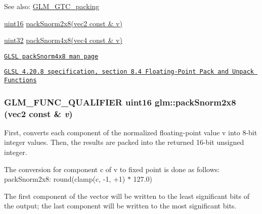 \begin{Desc}
\item[See also:]\hyperlink{group__gtc__packing}{GLM\_\-GTC\_\-packing} 

\hyperlink{group__gtc__type__precision_gd8c2939e1fdd8e5828b31d95c52255d5}{uint16} \hyperlink{group__gtc__packing_g05d08a82923166ec7cd5d0e6154c9953}{packSnorm2x8(vec2 const \& v)} 

\hyperlink{group__gtc__type__precision_g202b6a53c105fcb7e531f9b443518451}{uint32} \hyperlink{group__core__func__packing_gfcf25acc0d361c6c696a433aa5dfd16b}{packSnorm4x8(vec4 const \& v)} 

\href{http://www.opengl.org/sdk/docs/manglsl/xhtml/packSnorm4x8.xml}{\tt GLSL packSnorm4x8 man page} 

\href{http://www.opengl.org/registry/doc/GLSLangSpec.4.20.8.pdf}{\tt GLSL 4.20.8 specification, section 8.4 Floating-Point Pack and Unpack Functions} \end{Desc}
\hypertarget{group__gtc__packing_g05d08a82923166ec7cd5d0e6154c9953}{
\subsubsection[packSnorm2x8]{\setlength{\rightskip}{0pt plus 5cm}GLM\_\-FUNC\_\-QUALIFIER uint16 glm::packSnorm2x8 (vec2 const \& {\em v})}}
\label{group__gtc__packing_g05d08a82923166ec7cd5d0e6154c9953}


First, converts each component of the normalized floating-point value v into 8-bit integer values. Then, the results are packed into the returned 16-bit unsigned integer.

The conversion for component c of v to fixed point is done as follows: packSnorm2x8: round(clamp(c, -1, +1) $\ast$ 127.0)

The first component of the vector will be written to the least significant bits of the output; the last component will be written to the most significant bits.

